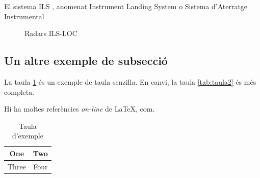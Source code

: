 ﻿\documentclass[10pt,a4paper,twocolumn,twoside]{article}
\begin{document}
El sistema ILS \cite{ILS}, anomenat Instrument Landing System o Sistema d'Aterratge Instrumental




\begin{figure}[!h]
\centering
{}
	\caption{Radars ILS-LOC}
	\label{fig-ils-loc}
\end{figure}

\subsection{Un altre exemple de subsecció}
\label{subsec-exemple2}

La taula \ref{tab:senzilla} és un exemple de taula senzilla. En canvi, la taula \ref{tab:taula2} és més completa.

Hi ha moltes referències \textit{on-line} de \LaTeX, com.

\begin{table}
\caption{Taula d'exemple}
\label{tab:senzilla}
\begin{center}
\begin{tabular}{|c|c|}
\hline
One & Two\\
\hline
Three & Four\\
\hline
\end{tabular}
\end{center}
\end{table}
\end{document}
